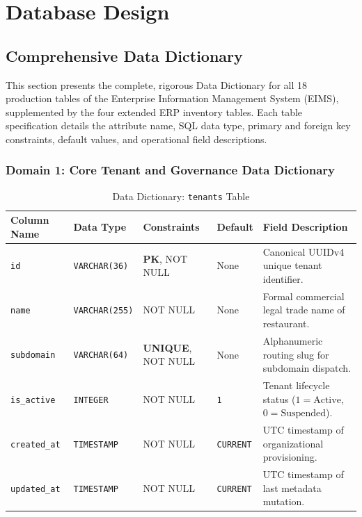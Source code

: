\chapter{Database Design}
\label{chap:database_design}

\section{Comprehensive Data Dictionary}
\label{sec:db_data_dictionary}
This section presents the complete, rigorous Data Dictionary for all 18 production tables of the Enterprise Information Management System (EIMS), supplemented by the four extended ERP inventory tables. Each table specification details the attribute name, SQL data type, primary and foreign key constraints, default values, and operational field descriptions.

\subsection{Domain 1: Core Tenant and Governance Data Dictionary}

\begin{table}[htbp]
\centering
\caption{Data Dictionary: \texttt{tenants} Table}
\label{tab:dict_tenants}
\small
\begin{tabularx}{\textwidth}{llp{3.0cm}lX}
\toprule
\textbf{Column Name} & \textbf{Data Type} & \textbf{Constraints} & \textbf{Default} & \textbf{Field Description} \\
\midrule
\texttt{id} & \texttt{VARCHAR(36)} & \textbf{PK}, NOT NULL & None & Canonical UUIDv4 unique tenant identifier. \\
\texttt{name} & \texttt{VARCHAR(255)} & NOT NULL & None & Formal commercial legal trade name of restaurant. \\
\texttt{subdomain} & \texttt{VARCHAR(64)} & \textbf{UNIQUE}, NOT NULL & None & Alphanumeric routing slug for subdomain dispatch. \\
\texttt{is\_active} & \texttt{INTEGER} & NOT NULL & \texttt{1} & Tenant lifecycle status ($1 = \text{Active}$, $0 = \text{Suspended}$). \\
\texttt{created\_at} & \texttt{TIMESTAMP} & NOT NULL & \texttt{CURRENT} & UTC timestamp of organizational provisioning. \\
\texttt{updated\_at} & \texttt{TIMESTAMP} & NOT NULL & \texttt{CURRENT} & UTC timestamp of last metadata mutation. \\
\bottomrule
\end{tabularx}
\end{table}

